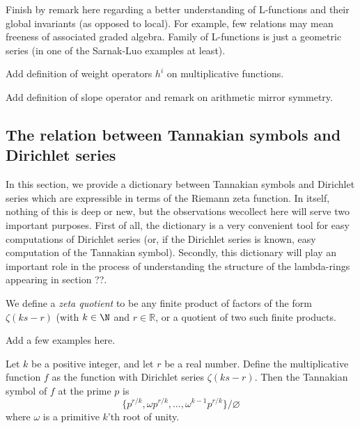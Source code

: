 \documentclass[a4paper]{article}
\begin{document}
Finish by remark here regarding a better understanding of L-functions and their global invariants (as opposed to local). For example, few relations may mean freeness of associated graded algebra. Family of L-functions is just a geometric series (in one of the Sarnak-Luo examples at least).

Add definition of weight operators $h^i$ on multiplicative functions.

Add definition of slope operator and remark on arithmetic mirror symmetry.


\subsection{The relation between Tannakian symbols and Dirichlet series}


In this section, we provide a dictionary between Tannakian symbols and Dirichlet series which are expressible in terms of the Riemann zeta function. In itself, nothing of this is deep or new, but the observations wecollect here will serve two important purposes. First of all, the dictionary is a very convenient tool for easy computations of Dirichlet series (or, if the Dirichlet series is known, easy computation of the Tannakian symbol). Secondly, this dictionary will play an important role in the process of understanding the structure of the lambda-rings appearing in section ??. 

\begin{definition}
We define a \emph{zeta quotient} to be any finite product of factors of the form $\zeta(ks-r)$ (with $k \in \N$ and $r \in \mathbb{R}$, or a quotient of two such finite products. 
\end{definition}


\begin{example}
Add a few examples here.
\end{example}

\begin{proposition}
Let $k$ be a positive integer, and let $r$ be a real number. Define the multiplicative function $f$ as the function with Dirichlet series $\zeta(ks-r)$. Then the Tannakian symbol of $f$ at the prime $p$ is  
$$  \{  p^{r/k}, \omega p^{r/k} , \ldots , \omega^{k-1} p^{r/k} \}   / \varnothing $$
where $\omega$ is a primitive $k$'th root of unity.
\end{proposition} 
\end{document}
